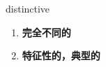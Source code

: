 
\begin{frame}
{\huge distinctive}
\begin{center}
\begin{enumerate}\Large
  \item \textbf{完全不同的}
  \item \textbf{特征性的，典型的}
\end{enumerate}
\end{center}
\end{frame}
